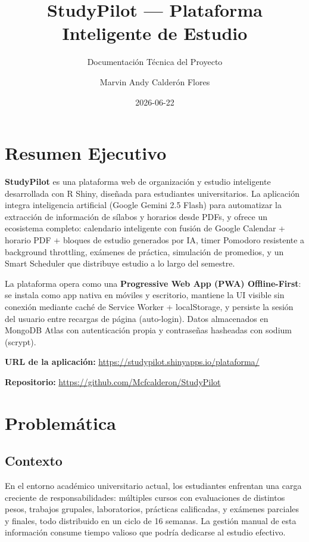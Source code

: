\documentclass[
  spanish,
  11pt,
  a4paper,
]{article}
\title{StudyPilot --- Plataforma Inteligente de Estudio}
\subtitle{Documentación Técnica del Proyecto}
\author{Marvin Andy Calderón Flores}
\date{2026-06-22}
\renewcommand*\contentsname{Tabla de contenidos}
\newcommand\contentsname{Tabla de contenidos}
\begin{document}
\maketitle

\renewcommand*\contentsname{Tabla de contenidos}
{
\setcounter{tocdepth}{3}
\tableofcontents
}

\section{Resumen Ejecutivo}\label{resumen-ejecutivo}

\textbf{StudyPilot} es una plataforma web de organización y estudio
inteligente desarrollada con R Shiny, diseñada para estudiantes
universitarios. La aplicación integra inteligencia artificial (Google
Gemini 2.5 Flash) para automatizar la extracción de información de
sílabos y horarios desde PDFs, y ofrece un ecosistema completo:
calendario inteligente con fusión de Google Calendar + horario PDF +
bloques de estudio generados por IA, timer Pomodoro resistente a
background throttling, exámenes de práctica, simulación de promedios, y
un Smart Scheduler que distribuye estudio a lo largo del semestre.

La plataforma opera como una \textbf{Progressive Web App (PWA)
Offline-First}: se instala como app nativa en móviles y escritorio,
mantiene la UI visible sin conexión mediante caché de Service Worker +
localStorage, y persiste la sesión del usuario entre recargas de página
(auto-login). Datos almacenados en MongoDB Atlas con autenticación
propia y contraseñas hasheadas con sodium (scrypt).

\textbf{URL de la aplicación:}
\url{https://studypilot.shinyapps.io/plataforma/}

\textbf{Repositorio:} \url{https://github.com/Mcfcalderon/StudyPilot}

\section{Problemática}\label{problemuxe1tica}

\subsection{Contexto}\label{contexto}

En el entorno académico universitario actual, los estudiantes enfrentan
una carga creciente de responsabilidades: múltiples cursos con
evaluaciones de distintos pesos, trabajos grupales, laboratorios,
prácticas calificadas, y exámenes parciales y finales, todo distribuido
en un ciclo de 16 semanas. La gestión manual de esta información consume
tiempo valioso que podría dedicarse al estudio efectivo.
\end{document}
